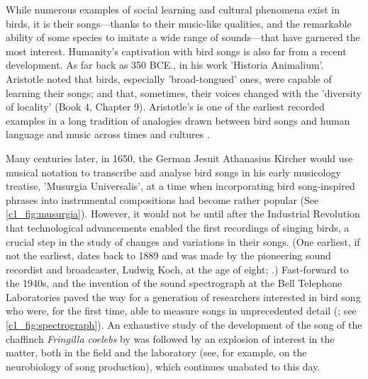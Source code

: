 While numerous examples of social learning and cultural phenomena exist in birds, it is their songs---thanks to their music-like qualities, and the remarkable ability of some species to imitate a wide range of sounds---that have garnered the most interest. Humanity's captivation with bird songs is also far from a recent development. As far back as 350 BCE., in his work 'Historia Animalium'. Aristotle noted that birds, especially 'broad-tongued' ones, were capable of learning their songs; and that, sometimes, their voices changed with the 'diversity of locality' (Book 4, Chapter 9). Aristotle's is one of the earliest recorded examples in a long tradition of analogies drawn between bird songs and human language and music across times and cultures \autocite{kleczkowska2015,zirin1980}.

Many centuries later, in 1650, the German Jesuit Athanasius Kircher would use musical notation to transcribe and analyse bird songs in his early musicology treatise, 'Musurgia Universalis', at a time when incorporating bird song-inspired phrases into instrumental compositions had become rather popular (See \autoref{c1_fig:musurgia}). However, it would not be until after the Industrial Revolution that technological advancements enabled the first recordings of singing birds, a crucial step in the study of changes and variations in their songs. (One earliest, if not the earliest, dates back to 1889 and was made by the pioneering sound recordist and broadcaster, Ludwig Koch, at the age of eight; \cite{britishlibrary2023}.) Fast-forward to the 1940s, and the invention of the sound spectrograph at the Bell Telephone Laboratories paved the way for a generation of researchers interested in bird song who were, for the first time, able to measure songs in unprecedented detail (\cite{baker2001a,koenig1946}; see \autoref{c1_fig:spectrograph}). An exhaustive study of the development of the song of the chaffinch \textit{Fringilla coelebs} by \textcite{thorpe1958} was followed by an explosion of interest in the matter, both in the field \autocite{Marler1962,marler1964} and the laboratory (see, for example, \cite{nottebohm1976} on the neurobiology of song production), which continues unabated to this day.

